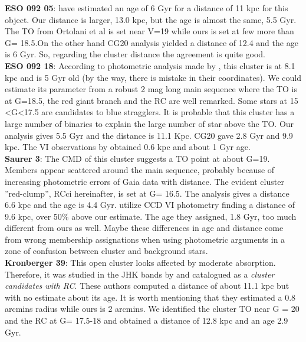 \documentclass[draft]{aa}
\begin{document}
  \textbf{ESO 092 05}: \cite{Ortolani_2008} have estimated an
  age of 6 Gyr for a distance of 11 kpc for this object.  Our distance is
  larger, 13.0 kpc, but the age is almost the same, 5.5 Gyr.  The TO from Ortolani et
  al is set near V=19 while ours is set  at few more than G= 18.5.On the other
  hand CG20 analysis yielded a distance of 12.4 and the age is 6
  Gyr. So, regarding the cluster distance the agreement is quite good.\\ 

  \textbf{ESO 092 18}: According to photometric analysis made by \cite{Carraro1995},
  this cluster is at 8.1 kpc and is 5 Gyr old (by the
  way, there is mistake in their coordinates). We could estimate its parameter from a
  robust 2 mag long main sequence where the TO is at G=18.5, the red giant branch
  and the RC are well remarked. Some stars at 15 <G<17.5 are candidates to blue
  stragglers. It is probable that this cluster has a large number of binaries to
  explain the large number of star above the TO. Our analysis gives 5.5 Gyr and
  the distance is 11.1 Kpc.  CG20 gave 2.8 Gyr and 9.9 kpc. The VI observations by
  \cite{Phelps_1994_develop} obtained 0.6 kpc and about 1 Gyr age.\\

  \textbf{Saurer 3}: The CMD of this cluster
  suggests a TO point at about G=19. Members appear
  scattered around the main sequence, probably because of increasing 
  photometric errors of Gaia data with distance. The evident cluster ''red-clump'', RCci
  hereinafter, is set at G= 16.5. The analysis gives a distance 6.6 kpc and the
  age is 4.4 Gyr. \cite{Carraro_2003} utilize CCD VI photometry finding a
  distance of 9.6 kpc, over 50\% above our estimate. The age they assigned, 1.8
  Gyr, too much different from ours as well. Maybe these differences in age and
  distance come from wrong membership assignations when using photometric
  arguments in a zone of confusion between cluster and background stars.\\

  \textbf{Kronberger 39}: This open cluster looks affected by moderate
  absorption. Therefore, it was studied in the JHK bands by \cite{Kronberger_2006}
  and catalogued as a \emph{cluster candidates with RC}. These authors computed a
  distance of about 11.1 kpc but with no estimate about its
  age. It is worth mentioning that they estimated a 0.8 arcmins
  radius while ours is 2 arcmins. We identified the cluster TO near G = 20 and the
  RC at G= 17.5-18 and obtained a distance of 12.8 kpc and an age 2.9 Gyr.\\
\end{document}

